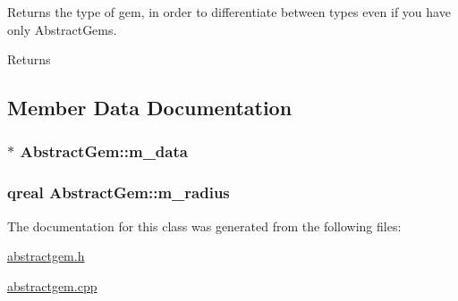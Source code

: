 Returns the type of gem, in order to differentiate between types even if you have only Abstract\+Gems. 

\begin{DoxyReturn}{Returns}

\end{DoxyReturn}


\subsection{Member Data Documentation}
\hypertarget{class_abstract_gem_a10a337f732ade69f1988659852f837c6}{
\subsubsection[{m\+\_\+data}]{$\ast$ Abstract\+Gem\+::m\+\_\+data\hspace{0.3cm}{\ttfamily [protected]}}}\label{class_abstract_gem_a10a337f732ade69f1988659852f837c6}
\hypertarget{class_abstract_gem_ab058af121fa66616cab7551e9418048a}{
\subsubsection[{m\+\_\+radius}]{\setlength{\rightskip}{0pt plus 5cm}qreal Abstract\+Gem\+::m\+\_\+radius\hspace{0.3cm}{\ttfamily [protected]}}}\label{class_abstract_gem_ab058af121fa66616cab7551e9418048a}


The documentation for this class was generated from the following files\+:\begin{DoxyCompactItemize}
\item 
\hyperlink{abstractgem_8h}{abstractgem.\+h}\item 
\hyperlink{abstractgem_8cpp}{abstractgem.\+cpp}\end{DoxyCompactItemize}
